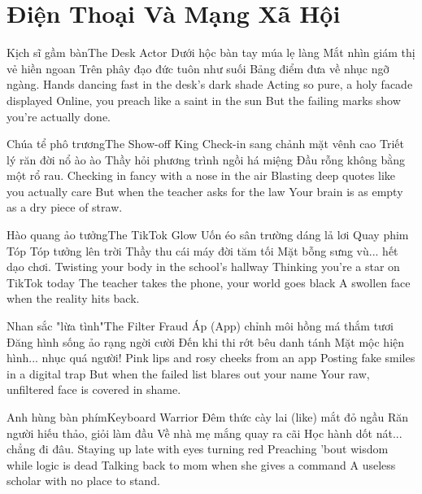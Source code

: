 \chapter{Điện Thoại Và Mạng Xã Hội}

\begin{tutuyetbox}{Kịch sĩ gầm bàn}{The Desk Actor}
Dưới hộc bàn tay múa lẹ làng
Mắt nhìn giám thị vẻ hiền ngoan
Trên phây đạo đức tuôn như suối
Bảng điểm đưa về nhục ngỡ ngàng.
\tcblower
Hands dancing fast in the desk's dark shade
Acting so pure, a holy facade displayed
Online, you preach like a saint in the sun
But the failing marks show you're actually done.
\end{tutuyetbox}

\begin{tutuyetbox}{Chúa tể phô trương}{The Show-off King}
Check-in sang chảnh mặt vênh cao
Triết lý răn đời nổ ào ào
Thầy hỏi phương trình ngồi há miệng
Đầu rỗng không bằng một rổ rau.
\tcblower
Checking in fancy with a nose in the air
Blasting deep quotes like you actually care
But when the teacher asks for the law
Your brain is as empty as a dry piece of straw.
\end{tutuyetbox}

\begin{tutuyetbox}{Hào quang ảo tưởng}{The TikTok Glow}
Uốn éo sân trường dáng lả lơi
Quay phim Tóp Tóp tưởng lên trời
Thầy thu cái máy đời tăm tối
Mặt bỗng sưng vù... hết dạo chơi.
\tcblower
Twisting your body in the school's hallway
Thinking you're a star on TikTok today
The teacher takes the phone, your world goes black
A swollen face when the reality hits back.
\end{tutuyetbox}

\begin{tutuyetbox}{Nhan sắc "lừa tình"}{The Filter Fraud}
Áp (App) chỉnh môi hồng má thắm tươi
Đăng hình sống ảo rạng ngời cười
Đến khi thi rớt bêu danh tánh
Mặt mộc hiện hình... nhục quá người!
\tcblower
Pink lips and rosy cheeks from an app
Posting fake smiles in a digital trap
But when the failed list blares out your name
Your raw, unfiltered face is covered in shame.
\end{tutuyetbox}

\begin{tutuyetbox}{Anh hùng bàn phím}{Keyboard Warrior}
Đêm thức cày lai (like) mắt đỏ ngầu
Răn người hiếu thảo, giỏi làm đầu
Về nhà mẹ mắng quay ra cãi
Học hành dốt nát... chẳng đi đâu.
\tcblower
Staying up late with eyes turning red
Preaching 'bout wisdom while logic is dead
Talking back to mom when she gives a command
A useless scholar with no place to stand.
\end{tutuyetbox}


